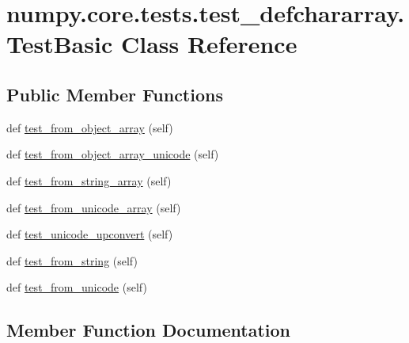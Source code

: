 \hypertarget{classnumpy_1_1core_1_1tests_1_1test__defchararray_1_1TestBasic}{}\section{numpy.\+core.\+tests.\+test\+\_\+defchararray.\+Test\+Basic Class Reference}
\label{classnumpy_1_1core_1_1tests_1_1test__defchararray_1_1TestBasic}
\subsection*{Public Member Functions}
\begin{DoxyCompactItemize}
\item 
def \hyperlink{classnumpy_1_1core_1_1tests_1_1test__defchararray_1_1TestBasic_a18975e525155cdceb393e9e618dd228c}{test\+\_\+from\+\_\+object\+\_\+array} (self)
\item 
def \hyperlink{classnumpy_1_1core_1_1tests_1_1test__defchararray_1_1TestBasic_aabba15bcf21e7de0586de989a56c797b}{test\+\_\+from\+\_\+object\+\_\+array\+\_\+unicode} (self)
\item 
def \hyperlink{classnumpy_1_1core_1_1tests_1_1test__defchararray_1_1TestBasic_ac4f69168fbc0e7b6f3f48f01c9223252}{test\+\_\+from\+\_\+string\+\_\+array} (self)
\item 
def \hyperlink{classnumpy_1_1core_1_1tests_1_1test__defchararray_1_1TestBasic_a59604ee7109eee1e7e339f9295b1bc25}{test\+\_\+from\+\_\+unicode\+\_\+array} (self)
\item 
def \hyperlink{classnumpy_1_1core_1_1tests_1_1test__defchararray_1_1TestBasic_ac830c5a670623e2dd548953a186c7140}{test\+\_\+unicode\+\_\+upconvert} (self)
\item 
def \hyperlink{classnumpy_1_1core_1_1tests_1_1test__defchararray_1_1TestBasic_a67b6ea7b34fa6acc3b43ab1695a4b138}{test\+\_\+from\+\_\+string} (self)
\item 
def \hyperlink{classnumpy_1_1core_1_1tests_1_1test__defchararray_1_1TestBasic_ada7b0d3c0439273cec383d46f001046b}{test\+\_\+from\+\_\+unicode} (self)
\end{DoxyCompactItemize}


\subsection{Member Function Documentation}
\mbox{\label{classnumpy_1_1core_1_1tests_1_1test__defchararray_1_1TestBasic_a18975e525155cdceb393e9e618dd228c}} 
